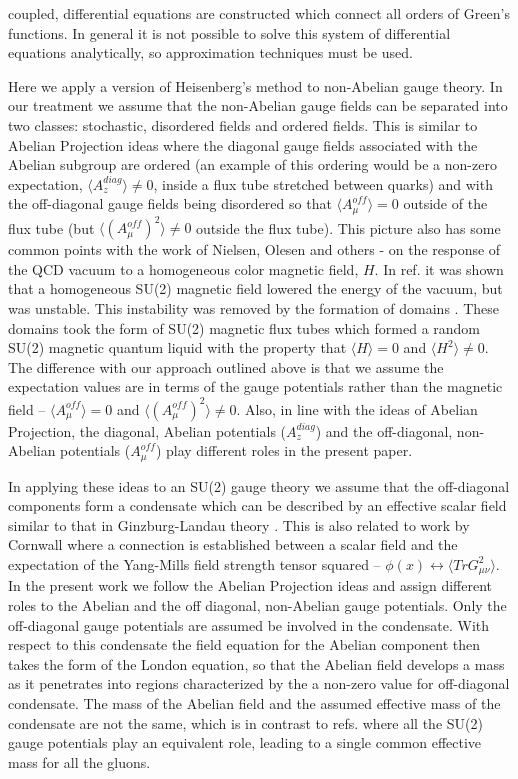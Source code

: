 \documentclass[a4paper,aps,showpacs]{revtex4}
\begin{document}
coupled, differential equations are constructed
which connect all orders of Green's functions. In general
it is not possible to solve this system of differential
equations analytically, so approximation techniques must
be used.
\par
Here we apply a version of Heisenberg's method to non-Abelian
gauge theory. In our treatment we assume that the non-Abelian
gauge fields can be separated into two classes: stochastic,
disordered fields and ordered fields. This is similar
to Abelian Projection ideas \cite{hooft}
where the diagonal gauge fields associated with the Abelian subgroup
are ordered (an example of this ordering would be a non-zero
expectation, $\langle A^{diag}_z \rangle \neq 0$, inside a
flux tube stretched between quarks) and with the off-diagonal gauge
fields being disordered so that $\langle A^{off}_\mu \rangle = 0$
outside of the flux tube (but $\langle (A^{off}_\mu)^2 \rangle \neq 0$
outside the flux tube). This picture also has some common
points with the work of Nielsen, Olesen and others
\cite{no1} - \cite{amb} on the response of the QCD vacuum to
a homogeneous color magnetic field, $H$. In ref. \cite{no1} it was
shown that a homogeneous SU(2) magnetic field lowered the
energy of the vacuum, but was unstable. This instability was
removed by the formation of domains \cite{no2}. These
domains took the form of SU(2) magnetic flux tubes which formed
a random SU(2) magnetic quantum liquid \cite{amb} with the
property that $\langle H \rangle =0$ and
$\langle H^2 \rangle \neq 0$. The difference with our approach
outlined above is that we assume the expectation values are in
terms of the gauge potentials rather than the magnetic field --
$\langle A^{off}_\mu \rangle = 0$ and $\langle (A^{off}_\mu)^2 \rangle
\neq 0$. Also, in line with the ideas of Abelian Projection, the
diagonal, Abelian potentials ($A^{diag}_z$) and the off-diagonal,
non-Abelian potentials ($A_{\mu} ^{off}$) play different roles
in the present paper.
\par
In applying these ideas to an SU(2)
gauge theory we assume that the off-diagonal components form a
condensate which can be described by an effective scalar field
similar to that in Ginzburg-Landau theory \cite{gl}. This
is also related to work by Cornwall \cite{cw} \cite{cw1} where a
connection is established between a scalar field and the expectation
of the Yang-Mills field strength tensor squared -- $\phi (x)
\leftrightarrow \langle Tr G_{\mu \nu} ^2 \rangle$. In the
present work we follow the Abelian Projection ideas and
assign different roles to the Abelian and the off diagonal,
non-Abelian gauge potentials. Only the off-diagonal gauge
potentials are assumed be involved in the condensate. With
respect to this condensate the field equation
for the Abelian component then takes the form
of the London equation, so that the Abelian field develops
a mass as it penetrates into regions characterized by the
a non-zero value for off-diagonal
condensate. The mass of the Abelian field and the
assumed effective mass of the condensate are not the same, which
is in contrast to refs. \cite{cw} \cite{cw1} where all the SU(2)
gauge potentials play an equivalent role, leading to a single
common effective mass for all the gluons.
\end{document}
